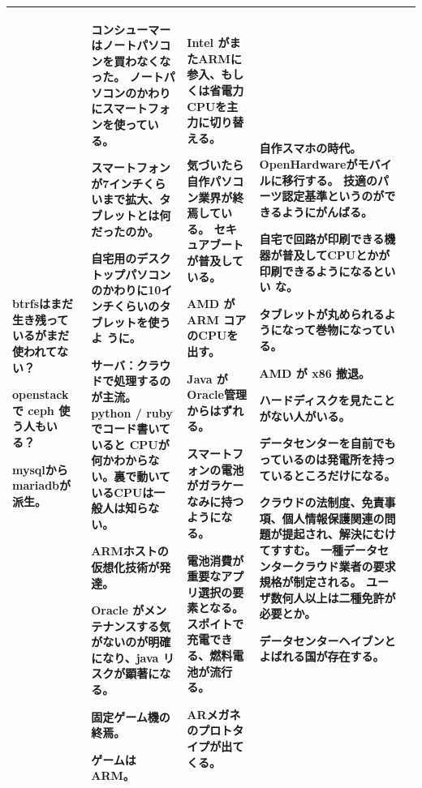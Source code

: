 \documentclass[mingoth,a4paper]{jsarticle}
\begin{document}
{\begin{tabular}[t]{|p{8em}|p{14em}|p{10em}|p{8em}|p{10em}|}
 btrfsはまだ生き残っているがまだ使われてない？

     openstack で ceph 使う人もいる？

 mysqlからmariadbが派生。

 & 

コンシューマーはノートパソコンを買わなくなった。
ノートパソコンのかわりにスマートフォンを使っている。

スマートフォンが7インチくらいまで拡大、タブレットとは何だったのか。

自宅用のデスクトップパソコンのかわりに10インチくらいのタブレットを使うよ
	 うに。

サーバ：クラウドで処理するのが主流。python / ruby でコード書いていると
	 CPUが何かわからない。裏で動いているCPUは一般人は知らない。

ARMホストの仮想化技術が発達。

Oracle がメンテナンスする気がないのが明確になり、java リスクが顕著になる。

固定ゲーム機の終焉。

ゲームはARM。

 & 

Intel がまたARMに参入、もしくは省電力CPUを主力に切り替える。

気づいたら自作パソコン業界が終焉している。
セキュアブートが普及している。

AMD が ARM コアのCPUを出す。

Java が Oracle管理からはずれる。

スマートフォンの電池がガラケーなみに持つようになる。

電池消費が重要なアプリ選択の要素となる。
スポイトで充電できる、燃料電池が流行る。

ARメガネのプロトタイプが出てくる。

 & 

自作スマホの時代。
OpenHardwareがモバイルに移行する。
技適のパーツ認定基準というのができるようにがんばる。

自宅で回路が印刷できる機器が普及してCPUとかが印刷できるようになるといい
		 な。

タブレットが丸められるようになって巻物になっている。

AMD が x86 撤退。

ハードディスクを見たことがない人がいる。

データセンターを自前でもっているのは発電所を持っているところだけになる。

クラウドの法制度、免責事項、個人情報保護関連の問題が提起され、解決にむけ
		 てすすむ。
一種データセンタークラウド業者の要求規格が制定される。
ユーザ数何人以上は二種免許が必要とか。

データセンターヘイブンとよばれる国が存在する。

\\

\hline
\end{tabular}
}
\end{document}
